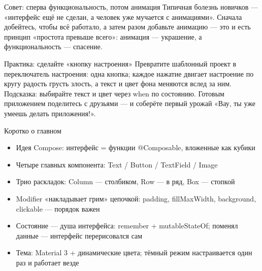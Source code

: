 \begin{tcbinfo}{Совет: сперва функциональность, потом анимация}
Типичная болезнь новичков — «интерфейс ещё не сделан, а человек уже мучается с анимациями». Сначала добейтесь, чтобы всё работало, а затем разом добавьте анимацию — это и есть принцип «простота превыше всего»: анимация — украшение, а функциональность — спасение.

\end{tcbinfo}

\begin{tcbpractice}{Практика: сделайте «кнопку настроения»}
Превратите шаблонный проект в переключатель настроения: одна кнопка; каждое нажатие двигает настроение по кругу радость грусть злость, а текст и цвет фона меняются вслед за ним. Подсказка: выбирайте текст и цвет через when по состоянию. Готовым приложением поделитесь с друзьями — и соберёте первый урожай «Вау, ты уже умеешь делать приложения!».

\end{tcbpractice}

\begin{tcbsummary}{Коротко о главном}
\begin{itemize}
  \item Идея Compose: интерфейс = функции @Composable, вложенные как кубики
  \item Четыре главных компонента: Text / Button / TextField / Image
  \item Трио раскладок: Column — столбиком, Row — в ряд, Box — стопкой
  \item Modifier «накладывает грим» цепочкой: padding, fillMaxWidth, background, clickable — порядок важен
  \item Состояние — душа интерфейса: remember + mutableStateOf; поменял данные — интерфейс перерисовался сам
  \item Тема: Material 3 + динамические цвета; тёмный режим настраивается один раз и работает везде
\end{itemize}

\end{tcbsummary}

